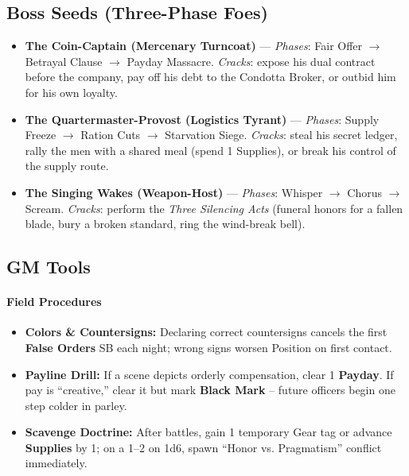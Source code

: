 \subsection*{Boss Seeds (Three-Phase Foes)}
\begin{itemize}
    \item \textbf{The Coin-Captain (Mercenary Turncoat)} --- \emph{Phases}: Fair Offer $\rightarrow$ Betrayal Clause $\rightarrow$ Payday Massacre. \emph{Cracks}: expose his dual contract before the company, pay off his debt to the Condotta Broker, or outbid him for his own loyalty.
    \item \textbf{The Quartermaster-Provost (Logistics Tyrant)} --- \emph{Phases}: Supply Freeze $\rightarrow$ Ration Cuts $\rightarrow$ Starvation Siege. \emph{Cracks}: steal his secret ledger, rally the men with a shared meal (spend 1 Supplies), or break his control of the supply route.
    \item \textbf{The Singing Wakes (Weapon-Host)} --- \emph{Phases}: Whisper $\rightarrow$ Chorus $\rightarrow$ Scream. \emph{Cracks}: perform the \textit{Three Silencing Acts} (funeral honors for a fallen blade, bury a broken standard, ring the wind-break bell).
\end{itemize}

\subsection*{GM Tools}

\paragraph{Field Procedures}
\begin{itemize}
    \item \textbf{Colors \& Countersigns:} Declaring correct countersigns cancels the first \textbf{False Orders} SB each night; wrong signs worsen Position on first contact.
    \item \textbf{Payline Drill:} If a scene depicts orderly compensation, clear 1 \textbf{Payday}. If pay is ``creative,'' clear it but mark \textbf{Black Mark} -- future officers begin one step colder in parley.
    \item \textbf{Scavenge Doctrine:} After battles, gain 1 temporary Gear tag or advance \textbf{Supplies} by 1; on a 1--2 on 1d6, spawn ``Honor vs. Pragmatism'' conflict immediately.
\end{itemize}

